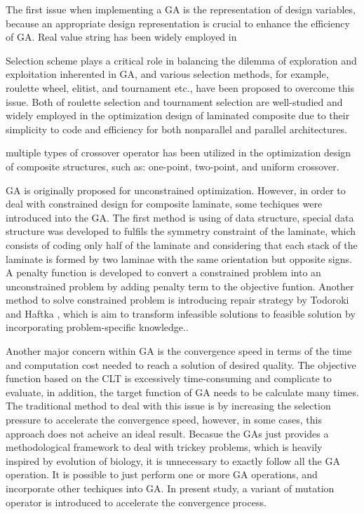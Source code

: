 The first issue when implementing a GA is the representation of design variables, because an
appropriate design representation is crucial to enhance the efficiency of GA. Real value string has
been widely employed in 

Selection scheme plays a critical role in balancing the dilemma of exploration and exploitation
inherented in GA, and various selection methods, for example, roulette wheel, elitist, and tournament
etc., have been proposed to overcome this issue. Both of roulette selection and tournament selection
are well-studied and widely employed in the optimization design of laminated composite due to their
simplicity to code and efficiency for both nonparallel and parallel architectures.


multiple types of crossover operator has been utilized in the optimization design of composite
structures, such as: one-point, two-point, and uniform crossover.



GA is originally proposed for unconstrained optimization. However, in order to deal with constrained
design for composite laminate, some techiques were introduced into the GA. The first method is using
of data structure, special data structure was developed to fulfils the symmetry constraint of the
laminate, which consists of coding only half of the laminate and considering that each stack of the
laminate is formed by two laminae with the same orientation but opposite
signs\cite{le1995improved,kogiso1994design}. A penalty function is developed to convert a constrained
problem into an unconstrained problem by adding penalty term to the objective funtion. Another
method to solve constrained problem is introducing repair strategy by Todoroki and Haftka
\cite{todoroki1998stacking}, which is aim to transform infeasible solutions to feasible solution by
incorporating problem-specific knowledge.. 

Another major concern within GA is the convergence speed in terms of the time and computation cost needed
to reach a solution of desired quality. The objective function based on the CLT is excessively
time-consuming and complicate to evaluate, in addition, the target function of GA  needs to be
calculate many times. The traditional method to deal with this issue is by increasing the selection
pressure to accelerate the convergence speed, however, in some cases, this approach does not acheive an
ideal result. Becasue the GAs just provides a methodological framework to deal with trickey
problems, which is heavily inspired by evolution of biology, it is unnecessary to exactly follow all
the  GA operation. It is possible to just perform one or more GA operations, and incorporate other
techiques into GA. In present study, a variant of mutation operator is introduced to accelerate the
convergence process.
  


